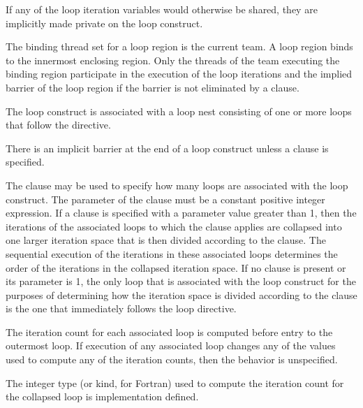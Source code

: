 If any of the loop iteration variables would otherwise be shared, they are implicitly 
made private on the loop construct.
\fortranspecificend


\binding
The binding thread set for a loop region is the current team. A loop region binds to the 
innermost enclosing  region. Only the threads of the team executing the 
binding  region participate in the execution of the loop iterations and the 
implied barrier of the loop region if the barrier is not eliminated by a  clause.

\descr
The loop construct is associated with a loop nest consisting of one or more loops that 
follow the directive.

There is an implicit barrier at the end of a loop construct unless a  clause is 
specified.

The  clause may be used to specify how many loops are 
associated with the loop construct. The parameter of the  
clause must be a constant positive integer expression. If a  
clause is specified with a parameter value greater than 1, then the 
iterations of the associated loops to which the clause applies are collapsed 
into one larger iteration space that is then divided according 
to the  clause. The sequential execution of the iterations 
in these associated loops determines the order of the iterations in the 
collapsed iteration space. If no  clause is present or its 
parameter is 1, the only loop that is associated with the loop construct 
for the purposes of determining how the iteration space is divided according 
to the  clause is the one that immediately follows the 
loop directive. 

The iteration count for each associated loop is computed before entry to the 
outermost loop. If execution of any associated loop changes any of the values 
used to compute any of the iteration counts, then the behavior is unspecified.

The integer type (or kind, for Fortran) used to compute the iteration count 
for the collapsed loop is implementation defined.

